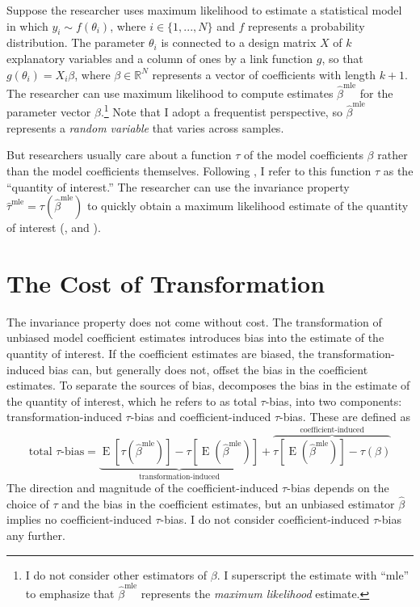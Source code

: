 \documentclass[10pt]{article}
\DeclareMathOperator*{\E}{\text{E}}
\begin{document}
Suppose the researcher uses maximum likelihood to estimate a statistical model in which $y_i \sim f(\theta_i)$, where $i \in \{1,..., N\}$ and $f$ represents a probability distribution. 
The parameter $\theta_i$ is connected to a design matrix $X$ of $k$ explanatory variables and a column of ones by a link function $g$, so that $g(\theta_i) = X_i\beta$, where $\beta \in \mathbb{R}^N$ represents a vector of coefficients with length $k + 1$. 
The researcher can use maximum likelihood to compute estimates $\hat{\beta}^{\text{mle}}$ for the parameter vector $\beta$.\footnote{I do not consider other estimators of $\beta$. I superscript the estimate with ``mle'' to emphasize that $\hat{\beta}^{\text{mle}}$ represents the \emph{maximum likelihood} estimate.} 
Note that I adopt a frequentist perspective, so $\hat{\beta}^{\text{mle}}$ represents a \emph{random variable} that varies across samples.

But researchers usually care about a function $\tau$ of the model coefficients $\beta$ rather than the model coefficients themselves. 
Following \cite{KingTomzWittenberg2000}, I refer to this function $\tau$ as the ``quantity of interest.''
The researcher can use the invariance property $\hat{\tau}^{\text{mle}} = \tau \left( \hat{\beta}^{\text{mle}}\right)$ to quickly obtain a maximum likelihood estimate of the quantity of interest (\citealt[pp. 75-76]{King1989}, and \citealt[pp. 320-321]{CasellaBerger2002}).

\section*{The Cost of Transformation}

The invariance property does not come without cost. 
The transformation of unbiased model coefficient estimates introduces bias into the estimate of the quantity of interest. 
If the coefficient estimates are biased, the transformation-induced bias can, but generally does not, offset the bias in the coefficient estimates. 
To separate the sources of bias, \citet[p. 404]{Rainey2017} decomposes the bias in the estimate of the quantity of interest, which he refers to as total $\tau$-bias, into two components: transformation-induced $\tau$-bias and coefficient-induced $\tau$-bias. These are defined as
\begin{equation}
\text{total } \tau\text{-bias}= \underbrace{ \E[\tau(\hat{\beta}^\text{mle})]-  \tau[\E(\hat{\beta}^\text{mle})]  }_{\text{transformation-induced}} + \overbrace{  \tau[\E(\hat{\beta}^\text{mle})] - \tau(\beta)  }^{\text{coefficient-induced}}\text{} \nonumber
\end{equation}
The direction and magnitude of the coefficient-induced $\tau$-bias depends on the choice of $\tau$ and the bias in the coefficient estimates, but an unbiased estimator $\hat{\beta}$ implies no coefficient-induced $\tau$-bias.
I do not consider coefficient-induced $\tau$-bias any further.
\end{document}
